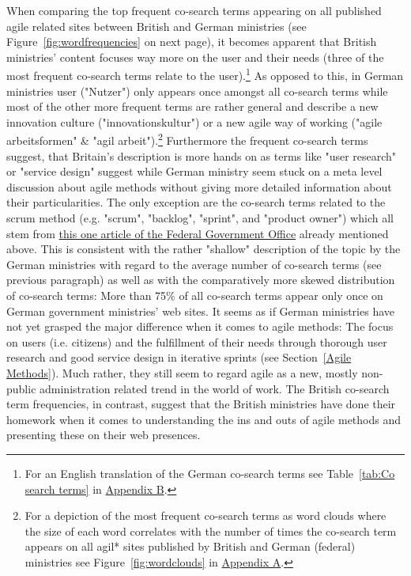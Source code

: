 When comparing the top frequent co-search terms appearing on all published agile related sites between British and German ministries (see Figure~\ref{fig:wordfrequencies} on next page), it becomes apparent that British ministries' content focuses way more on the user and their needs (three of the most frequent co-search terms relate to the user).\footnote{For an English translation of the German co-search terms see Table~\ref{tab:Co search terms} in \hyperref[Appendix B]{Appendix B}.} As opposed to this, in German ministries user ("Nutzer") only appears once amongst all co-search terms while most of the other more frequent terms are rather general and describe a new innovation culture ("innovationskultur") or a new agile way of working ("agile arbeitsformen"  \& "agil arbeit").\footnote{For a depiction of the most frequent co-search terms as word clouds where the size of each word correlates with the number of times the co-search term appears on all agil* sites published by British and German (federal) ministries see Figure~\ref{fig:wordclouds} in \hyperref[Appendix A]{Appendix A}.} Furthermore the frequent co-search terms suggest, that Britain's description is more hands on as terms like "user research" or "service design" suggest while German ministry seem stuck on a meta level discussion about agile methods without giving more detailed information about their particularities. The only exception are the co-search terms related to the scrum method (e.g. "scrum", "backlog", "sprint", and "product owner") which all stem from \href{https://www.bundesregierung.de/breg-de/themen/forschung/agil-arbeiten-bei-der-software-entwicklung-276792}{this one article of the Federal Government Office} already mentioned above. This is consistent with the rather "shallow" description of the topic by the German ministries with regard to the average number of co-search terms (see previous paragraph) as well as with the comparatively more skewed distribution of co-search terms: More than 75\% of all co-search terms appear only once on German government ministries' web sites. It seems as if German ministries have not yet grasped the major difference when it comes to agile methods: The focus on users (i.e. citizens) and the fulfillment of their needs through thorough user research and good service design in iterative sprints (see Section~\ref{Agile Methods}). Much rather, they still seem to regard agile as a new, mostly non-public administration related trend in the world of work. The British co-search term frequencies, in contrast, suggest that the British ministries have done their homework when it comes to understanding the ins and outs of agile methods and presenting these on their web presences.


